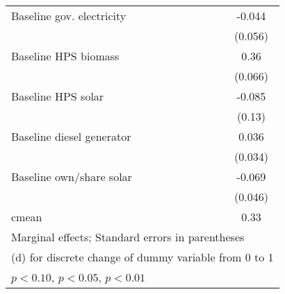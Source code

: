 \begin{table}[htbp]
\begin{tabular*}{1\hsize}{@{\hskip\tabcolsep\extracolsep\fill}l*{5}{c}}
Baseline gov. electricity&                  &                  &                  &                  &   -0.044         \\
                &                  &                  &                  &                  &  (0.056)         \\
Baseline HPS biomass&                  &                  &                  &                  &     0.36\sym{***}\\
                &                  &                  &                  &                  &  (0.066)         \\
Baseline HPS solar&                  &                  &                  &                  &   -0.085         \\
                &                  &                  &                  &                  &   (0.13)         \\
Baseline diesel generator&                  &                  &                  &                  &    0.036         \\
                &                  &                  &                  &                  &  (0.034)         \\
Baseline own/share solar&                  &                  &                  &                  &   -0.069         \\
                &                  &                  &                  &                  &  (0.046)         \\
\midrule
cmean           &                  &                  &                  &                  &     0.33         \\
\bottomrule
\multicolumn{6}{l}{\footnotesize Marginal effects; Standard errors in parentheses}\\
\multicolumn{6}{l}{\footnotesize  (d) for discrete change of dummy variable from 0 to 1}\\
\multicolumn{6}{l}{\footnotesize \sym{*} \(p<0.10\), \sym{**} \(p<0.05\), \sym{***} \(p<0.01\)}\\
\end{tabular*}
\end{table}
